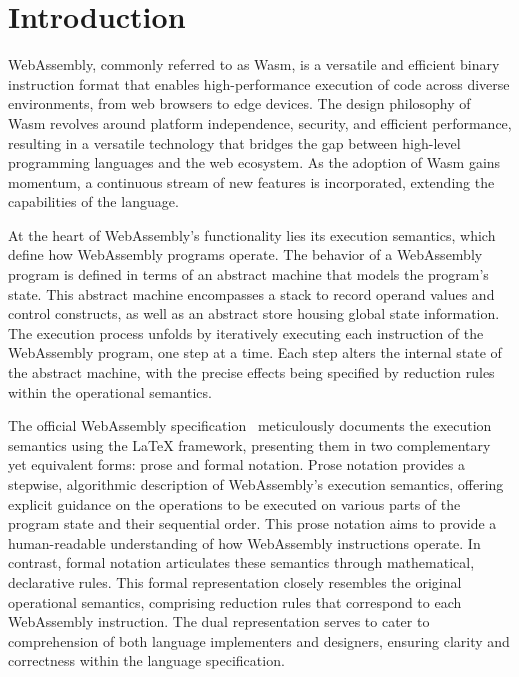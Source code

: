 \section{Introduction}\label{sec:intro}

WebAssembly, commonly referred to as Wasm, is a versatile and efficient binary
instruction format that enables high-performance execution of code across
diverse environments, from web browsers to edge devices. The design philosophy
of Wasm revolves around platform independence, security, and efficient
performance, resulting in a versatile technology that bridges the gap between
high-level programming languages and the web ecosystem. As the adoption of Wasm
gains momentum, a continuous stream of new features is incorporated, extending
the capabilities of the language.

At the heart of WebAssembly's functionality lies its execution semantics, which
define how WebAssembly programs operate. The behavior of a WebAssembly program
is defined in terms of an abstract machine that models the program's state.
This abstract machine encompasses a stack to record operand values and control
constructs, as well as an abstract store housing global state information. The
execution process unfolds by iteratively executing each instruction of the
WebAssembly program, one step at a time. Each step alters the internal state of
the abstract machine, with the precise effects being specified by reduction
rules within the operational semantics.

The official WebAssembly specification~\cite{wasmspec} meticulously documents
the execution semantics using the LaTeX framework, presenting them in two
complementary yet equivalent forms: prose and formal notation. Prose notation
provides a stepwise, algorithmic description of WebAssembly's execution
semantics, offering explicit guidance on the operations to be executed on
various parts of the program state and their sequential order. This prose
notation aims to provide a human-readable understanding of how WebAssembly
instructions operate.  In contrast, formal notation articulates these semantics
through mathematical, declarative rules. This formal representation closely
resembles the original operational semantics, comprising reduction rules that
correspond to each WebAssembly instruction. The dual representation serves to
cater to comprehension of both language implementers and designers, ensuring
clarity and correctness within the language specification.


